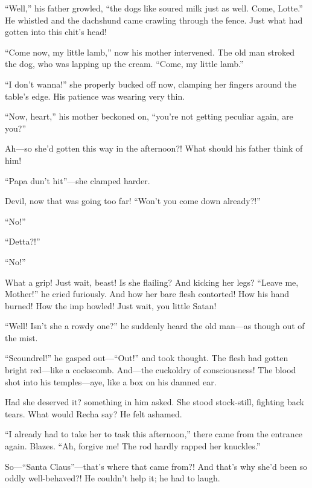 \documentclass[12pt,a4paper]{article}
\begin{document}
“Well,” his father growled, “the dogs like soured milk just as well. Come, Lotte.” He whistled and the dachshund came crawling through the fence. Just what had gotten into this chit’s head!

“Come now, my little lamb,” now his mother intervened. The old man stroked the dog, who was lapping up the cream. “Come, my little lamb.”

“I don’t wanna!” she properly bucked off now, clamping her fingers around the table’s edge. His patience was wearing very thin.

“Now, heart,” his mother beckoned on, “you’re not getting peculiar again, are you?”

Ah—so she’d gotten this way in the afternoon?! What should his father think of him!

“Papa dun’t hit”—she clamped harder.

Devil, now that was going too far! “Won’t you come down already?!”

“No!”

“Detta?!”

“No!”

What a grip! Just wait, beast! Is she flailing? And kicking her legs? “Leave me, Mother!” he cried furiously. And how her bare flesh contorted! How his hand burned! How the imp howled! Just wait, you little Satan!

“Well! Isn’t she a rowdy one?” he suddenly heard the old man—as though out of the mist.

“Scoundrel!” he gasped out—“Out!” and took thought. The flesh had gotten bright red—like a cockscomb. And—the cuckoldry of consciousness! The blood shot into his temples—aye, like a box on his damned ear.

Had she deserved it? something in him asked. She stood stock-still, fighting back tears. What would Recha say? He felt ashamed.

“I already had to take her to task this afternoon,” there came from the entrance again. Blazes. “Ah, forgive me! The rod hardly rapped her knuckles.”

So—“Santa Claus”—that’s where that came from?! And that’s why she’d been so oddly well-behaved?! He couldn’t help it; he had to laugh.
\end{document}
